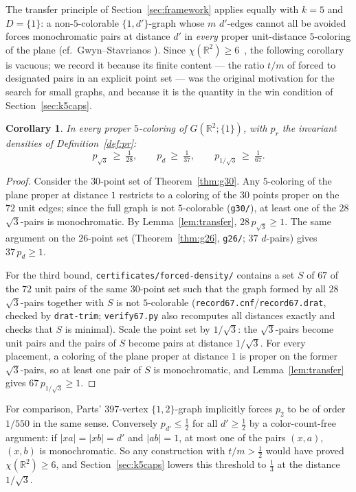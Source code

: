 \documentclass[11pt]{article}
\newtheorem{corollary}[theorem]{Corollary}
\theoremstyle{definition}
\theoremstyle{remark}
\newcommand{\R}{\mathbb{R}}
\newcommand{\dd}{d}                          %
\begin{document}
The transfer principle of Section~\ref{sec:framework} applies equally
with $k=5$ and $D=\{1\}$: a non-$5$-colorable $\{1,\dd'\}$-graph whose
$m$ $\dd'$-edges cannot all be avoided forces monochromatic pairs at
distance $\dd'$ in \emph{every} proper unit-distance $5$-coloring of the
plane (cf.\ Gwyn--Stavrianos \cite{GwynStavrianos20}).  Since
$\chi(\R^2)\ge6$~\cite{OAI}, the following corollary is vacuous; we
record it because its finite content --- the ratio $t/m$ of forced to
designated pairs in an explicit point set --- was the original
motivation for the search for small graphs, and because it is the
quantity in the win condition of Section~\ref{sec:k5caps}.

\begin{corollary}\label{cor:forced}
In every proper $5$-coloring of $G(\R^2;\{1\})$, with $p_r$ the invariant
densities of Definition~\ref{def:pr}:
\[
  p_{\sqrt3}\ \ge\ \tfrac1{28},
  \qquad
  p_{\dd}\ \ge\ \tfrac1{37},
  \qquad
  p_{1/\sqrt3}\ \ge\ \tfrac1{67}.
\]
\end{corollary}

\begin{proof}
Consider the $30$-point set of Theorem~\ref{thm:g30}.  Any $5$-coloring
of the plane proper at distance $1$ restricts to a coloring of the $30$
points proper on the $72$ unit edges; since the full graph is not
$5$-colorable (\texttt{g30/}), at least one of the $28$ $\sqrt3$-pairs is
monochromatic.  By Lemma~\ref{lem:transfer}, $28\,p_{\sqrt3}\ge1$.  The
same argument on the $26$-point set (Theorem~\ref{thm:g26},
\texttt{g26/}; $37$ $\dd$-pairs) gives $37\,p_{\dd}\ge1$.

For the third bound, \texttt{certificates/forced-density/} contains a set
$S$ of $67$ of the $72$ unit pairs of the same $30$-point set such that
the graph formed by all $28$ $\sqrt3$-pairs together with $S$ is not
$5$-colorable (\texttt{record67.cnf}/\texttt{record67.drat}, checked by
\texttt{drat-trim}; \texttt{verify67.py} also recomputes all distances
exactly and checks that $S$ is minimal).  Scale the point set by
$1/\sqrt3$: the $\sqrt3$-pairs become unit pairs and the pairs of $S$
become pairs at distance $1/\sqrt3$.  For every placement, a coloring of
the plane proper at distance $1$ is proper on the former $\sqrt3$-pairs,
so at least one pair of $S$ is monochromatic, and
Lemma~\ref{lem:transfer} gives $67\,p_{1/\sqrt3}\ge1$.
\end{proof}

For comparison, Parts' $397$-vertex $\{1,2\}$-graph \cite{Parts20a}
implicitly forces $p_2$ to be of order $1/550$ in the same sense.
Conversely $p_{\dd'}\le\tfrac12$ for all $\dd'\ge\tfrac12$ by a
color-count-free argument: if $|xa|=|xb|=\dd'$ and $|ab|=1$, at most one
of the pairs $(x,a)$, $(x,b)$ is monochromatic.  So any construction with
$t/m>\tfrac12$ would have proved $\chi(\R^2)\ge6$, and
Section~\ref{sec:k5caps} lowers this threshold to $\tfrac13$ at the
distance $1/\sqrt3$.
\end{document}
